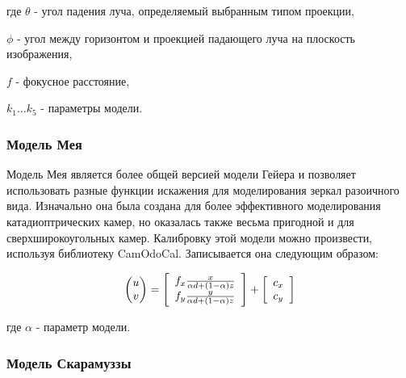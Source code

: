 где $\theta$ - угол падения луча, определяемый выбранным типом проекции,

\qquad $\phi$ - угол между горизонтом и проекцией падающего луча на плоскость изображения, 


\qquad $f$ - фокусное расстояние, 

\qquad $k_1 \dots k_5$ - параметры модели.

\subsubsection{Модель Мея}

Модель Мея \cite{mei} является более общей версией модели Гейера \cite{geyer} и позволяет использовать разные 
функции искажения для моделирования зеркал разоичного вида. Изначально она была создана для более 
эффективного моделирования катадиоптрических камер, но оказалась также весьма пригодной и для сверхширокоугольных камер. 
Калибровку этой модели можно произвести, используя библиотеку CamOdoCal. Записывается она следующим образом:

\begin{equation}
    \vspace{12pt}
    \begin{pmatrix}u\\v\end{pmatrix}=\left[\begin{array}{l}
	f_{x} \frac{x}{\alpha d+(1-\alpha) z} \\
	f_{y} \frac{y}{\alpha d+(1-\alpha) z}
	\end{array}\right]+\left[\begin{array}{l}
	c_{x} \\
	c_{y}
	\end{array}\right]
    \vspace{12pt}
\end{equation}

где $\alpha$ - параметр модели. 

\subsubsection{Модель Скарамуззы}

